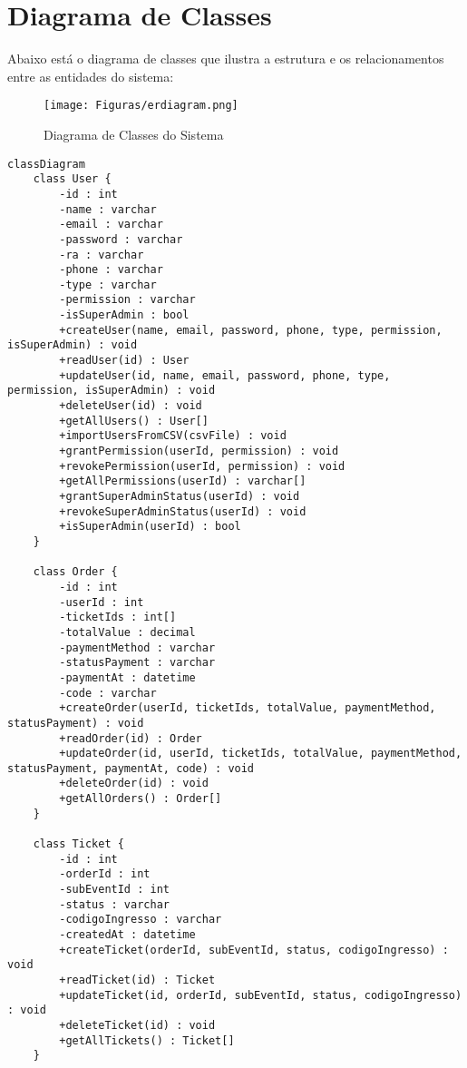 \section{Diagrama de Classes}

Abaixo está o diagrama de classes que ilustra a estrutura e os relacionamentos entre as entidades do sistema:

\begin{figure}[h]
\centering
\texttt{[image: Figuras/erdiagram.png]}
\caption{Diagrama de Classes do Sistema}
\label{fig:diagrama-classes}
\end{figure}

\begin{verbatim}
classDiagram
    class User {
        -id : int
        -name : varchar
        -email : varchar
        -password : varchar
        -ra : varchar
        -phone : varchar
        -type : varchar
        -permission : varchar
        -isSuperAdmin : bool
        +createUser(name, email, password, phone, type, permission, isSuperAdmin) : void
        +readUser(id) : User
        +updateUser(id, name, email, password, phone, type, permission, isSuperAdmin) : void
        +deleteUser(id) : void
        +getAllUsers() : User[]
        +importUsersFromCSV(csvFile) : void
        +grantPermission(userId, permission) : void
        +revokePermission(userId, permission) : void
        +getAllPermissions(userId) : varchar[]
        +grantSuperAdminStatus(userId) : void
        +revokeSuperAdminStatus(userId) : void
        +isSuperAdmin(userId) : bool
    }

    class Order {
        -id : int
        -userId : int
        -ticketIds : int[]
        -totalValue : decimal
        -paymentMethod : varchar
        -statusPayment : varchar
        -paymentAt : datetime
        -code : varchar
        +createOrder(userId, ticketIds, totalValue, paymentMethod, statusPayment) : void
        +readOrder(id) : Order
        +updateOrder(id, userId, ticketIds, totalValue, paymentMethod, statusPayment, paymentAt, code) : void
        +deleteOrder(id) : void
        +getAllOrders() : Order[]
    }

    class Ticket {
        -id : int
        -orderId : int
        -subEventId : int
        -status : varchar
        -codigoIngresso : varchar
        -createdAt : datetime
        +createTicket(orderId, subEventId, status, codigoIngresso) : void
        +readTicket(id) : Ticket
        +updateTicket(id, orderId, subEventId, status, codigoIngresso) : void
        +deleteTicket(id) : void
        +getAllTickets() : Ticket[]
    }


\end{verbatim}
